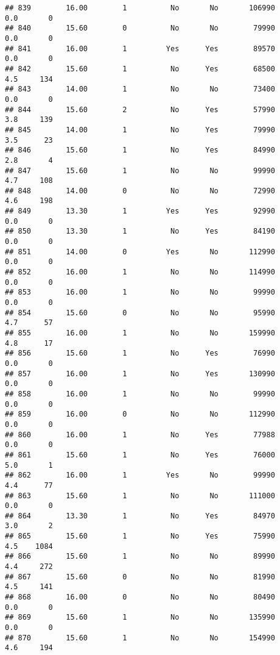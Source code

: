 \documentclass[
]{article}
\begin{document}
\begin{verbatim}
## 839        16.00        1          No       No       106990         0.0       0
## 840        15.60        0          No       No        79990         0.0       0
## 841        16.00        1         Yes      Yes        89570         0.0       0
## 842        15.60        1          No      Yes        68500         4.5     134
## 843        14.00        1          No       No        73400         0.0       0
## 844        15.60        2          No      Yes        57990         3.8     139
## 845        14.00        1          No      Yes        79990         3.5      23
## 846        15.60        1          No      Yes        84990         2.8       4
## 847        15.60        1          No       No        99990         4.7     108
## 848        14.00        0          No       No        72990         4.6     198
## 849        13.30        1         Yes      Yes        92990         0.0       0
## 850        13.30        1          No      Yes        84190         0.0       0
## 851        14.00        0         Yes       No       112990         0.0       0
## 852        16.00        1          No       No       114990         0.0       0
## 853        16.00        1          No       No        99990         0.0       0
## 854        15.60        0          No       No        95990         4.7      57
## 855        16.00        1          No       No       159990         4.8      17
## 856        15.60        1          No      Yes        76990         0.0       0
## 857        16.00        1          No      Yes       130990         0.0       0
## 858        16.00        1          No       No        99990         0.0       0
## 859        16.00        0          No       No       112990         0.0       0
## 860        16.00        1          No      Yes        77988         0.0       0
## 861        15.60        1          No      Yes        76000         5.0       1
## 862        16.00        1         Yes       No        99990         4.4      77
## 863        15.60        1          No       No       111000         0.0       0
## 864        13.30        1          No      Yes        84970         3.0       2
## 865        15.60        1          No      Yes        75990         4.5    1084
## 866        15.60        1          No       No        89990         4.4     272
## 867        15.60        0          No       No        81990         4.5     141
## 868        16.00        0          No       No        80490         0.0       0
## 869        15.60        1          No       No       135990         0.0       0
## 870        15.60        1          No       No       154990         4.6     194

\end{verbatim}
\end{document}
